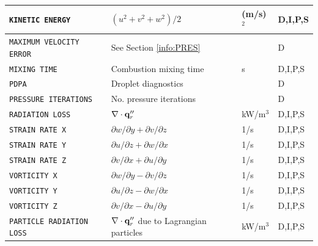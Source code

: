 \documentclass[11pt]{book}
\newcommand{\ct}{\tt\small}
\newcommand{\bq}{{\bf q}}
\begin{document}
\begin{longtable}{@{\extracolsep{\fill}}|l|l|l|l|}
{\ct KINETIC ENERGY}                            & $(u^2+v^2+w^2)/2$                                 & (m/s)$^2$      & D,I,P,S      \\ \hline
{\ct MAXIMUM VELOCITY ERROR}                    & See Section \ref{info:PRES}                       &                & D            \\ \hline
{\ct MIXING TIME}                               & Combustion mixing time                            & s              & D,I,P,S      \\ \hline
{\ct PDPA}                                      & Droplet diagnostics                               &                & D            \\ \hline
{\ct PRESSURE ITERATIONS}                       & No. pressure iterations                           &                & D            \\ \hline
{\ct RADIATION LOSS}                            & $\nabla \cdot \bq_r''$                            & kW/m$^3$       & D,I,P,S      \\ \hline
{\ct STRAIN RATE X}                             & $\partial w/\partial y + \partial v/\partial z$   & 1/s            & D,I,P,S      \\ \hline
{\ct STRAIN RATE Y}                             & $\partial u/\partial z + \partial w/\partial x$   & 1/s            & D,I,P,S      \\ \hline
{\ct STRAIN RATE Z}                             & $\partial v/\partial x + \partial u/\partial y$   & 1/s            & D,I,P,S      \\ \hline
{\ct VORTICITY X}                               & $\partial w/\partial y - \partial v/\partial z$   & 1/s            & D,I,P,S      \\ \hline
{\ct VORTICITY Y}                               & $\partial u/\partial z - \partial w/\partial x$   & 1/s            & D,I,P,S      \\ \hline
{\ct VORTICITY Z}                               & $\partial v/\partial x - \partial u/\partial y$   & 1/s            & D,I,P,S      \\ \hline
{\ct PARTICLE RADIATION LOSS}                   & $\nabla \cdot \bq_r''$ due to Lagrangian particles& kW/m$^3$       & D,I,P,S      \\ \hline
\end{longtable}
\end{document}
